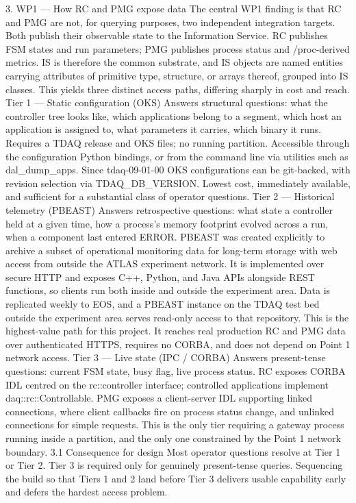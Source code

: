 3. WP1 — How RC and PMG expose data
The central WP1 finding is that RC and PMG are not, for querying purposes, two independent integration targets. Both publish their observable state to the Information Service. RC publishes FSM states and run parameters; PMG publishes process status and /proc-derived metrics. IS is therefore the common substrate, and IS objects are named entities carrying attributes of primitive type, structure, or arrays thereof, grouped into IS classes.
This yields three distinct access paths, differing sharply in cost and reach.
Tier 1 — Static configuration (OKS)
Answers structural questions: what the controller tree looks like, which applications belong to a segment, which host an application is assigned to, what parameters it carries, which binary it runs.
Requires a TDAQ release and OKS files; no running partition. Accessible through the configuration Python bindings, or from the command line via utilities such as dal_dump_apps. Since tdaq-09-01-00 OKS configurations can be git-backed, with revision selection via TDAQ_DB_VERSION.
Lowest cost, immediately available, and sufficient for a substantial class of operator questions.
Tier 2 — Historical telemetry (PBEAST)
Answers retrospective questions: what state a controller held at a given time, how a process's memory footprint evolved across a run, when a component last entered ERROR.
PBEAST was created explicitly to archive a subset of operational monitoring data for long-term storage with web access from outside the ATLAS experiment network. It is implemented over secure HTTP and exposes C++, Python, and Java APIs alongside REST functions, so clients run both inside and outside the experiment area. Data is replicated weekly to EOS, and a PBEAST instance on the TDAQ test bed outside the experiment area serves read-only access to that repository.
This is the highest-value path for this project. It reaches real production RC and PMG data over authenticated HTTPS, requires no CORBA, and does not depend on Point 1 network access.
Tier 3 — Live state (IPC / CORBA)
Answers present-tense questions: current FSM state, busy flag, live process status.
RC exposes CORBA IDL centred on the rc::controller interface; controlled applications implement daq::rc::Controllable. PMG exposes a client-server IDL supporting linked connections, where client callbacks fire on process status change, and unlinked connections for simple requests.
This is the only tier requiring a gateway process running inside a partition, and the only one constrained by the Point 1 network boundary.
3.1 Consequence for design
Most operator questions resolve at Tier 1 or Tier 2. Tier 3 is required only for genuinely present-tense queries. Sequencing the build so that Tiers 1 and 2 land before Tier 3 delivers usable capability early and defers the hardest access problem.

